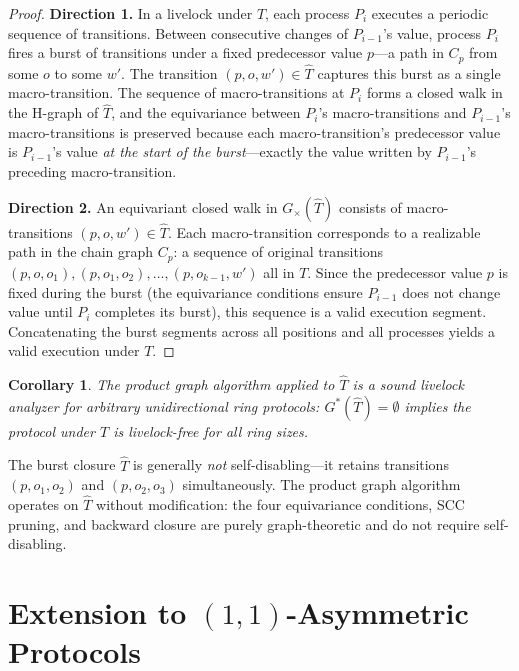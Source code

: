 \documentclass[11pt]{article}
\newtheorem{corollary}[theorem]{Corollary}
\begin{document}
\begin{proof}
\textbf{Direction 1.} In a livelock under $T$, each process $P_i$ executes a periodic sequence of transitions. Between consecutive changes of $P_{i-1}$'s value, process $P_i$ fires a burst of transitions under a fixed predecessor value $p$---a path in $C_p$ from some $o$ to some $w'$. The transition $(p, o, w') \in \hat{T}$ captures this burst as a single macro-transition. The sequence of macro-transitions at $P_i$ forms a closed walk in the H-graph of $\hat{T}$, and the equivariance between $P_i$'s macro-transitions and $P_{i-1}$'s macro-transitions is preserved because each macro-transition's predecessor value is $P_{i-1}$'s value \emph{at the start of the burst}---exactly the value written by $P_{i-1}$'s preceding macro-transition.

\textbf{Direction 2.} An equivariant closed walk in $G_\times(\hat{T})$ consists of macro-transitions $(p, o, w') \in \hat{T}$. Each macro-transition corresponds to a realizable path in the chain graph $C_p$: a sequence of original transitions $(p, o, o_1), (p, o_1, o_2), \ldots, (p, o_{k-1}, w')$ all in $T$. Since the predecessor value $p$ is fixed during the burst (the equivariance conditions ensure $P_{i-1}$ does not change value until $P_i$ completes its burst), this sequence is a valid execution segment. Concatenating the burst segments across all positions and all processes yields a valid execution under $T$.
\end{proof}

\begin{corollary}
The product graph algorithm applied to $\hat{T}$ is a sound livelock analyzer for arbitrary unidirectional ring protocols: $G^*(\hat{T}) = \emptyset$ implies the protocol under $T$ is livelock-free for all ring sizes.
\end{corollary}

The burst closure $\hat{T}$ is generally \emph{not} self-disabling---it retains transitions $(p, o_1, o_2)$ and $(p, o_2, o_3)$ simultaneously. The product graph algorithm operates on $\hat{T}$ without modification: the four equivariance conditions, SCC pruning, and backward closure are purely graph-theoretic and do not require self-disabling.

\section{Extension to $(1,1)$-Asymmetric Protocols}
\label{sec:asymmetry}
\end{document}
